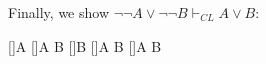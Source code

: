 Finally, we show $\neg\neg A \lor \neg\neg B \vdash_{CL} A \lor B$:
\begin{prooftree*}
[\dne]{A}
[\di]{A \lor B}
[\dne]{B}
[\di]{A \lor B}
[]{A \lor B}
\end{prooftree*}

